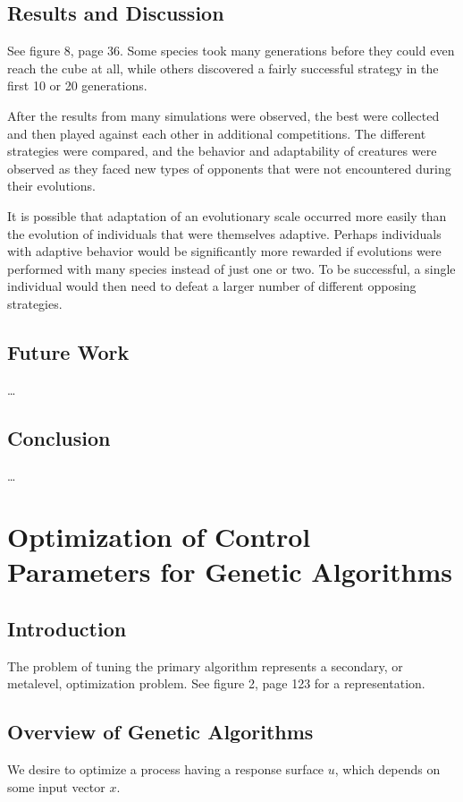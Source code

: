\documentclass[12pt]{book}
\begin{document}
\section{Results and Discussion}
See figure 8, page 36. Some species took many generations before they could even reach the cube at all, while others discovered a fairly successful strategy in the first 10 or 20 generations.

After the results from many simulations were observed, the best were collected and then played against each other in additional competitions. The different strategies were compared, and the behavior and adaptability of creatures were observed as they faced new types of opponents that were not encountered during their evolutions.

It is possible that adaptation of an evolutionary scale occurred more easily than the evolution of individuals that were themselves adaptive. Perhaps individuals with adaptive behavior would be significantly more rewarded if evolutions were performed with many species instead of just one or two. To be successful, a single individual would then need to defeat a larger number of different opposing strategies.

\section{Future Work}
\dots

\section{Conclusion}
\dots
\clearpage

\chapter{Optimization of Control Parameters for Genetic Algorithms}
\section{Introduction}
The problem of tuning the primary algorithm represents a secondary, or metalevel, optimization problem. See figure 2, page 123 for a representation.

\section{Overview of Genetic Algorithms}
We desire to optimize a process having a response surface $u$, which depends on some input vector $x$.
\end{document}
